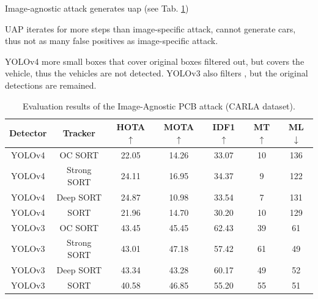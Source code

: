 Image-agnostic attack generates \acrfull{uap} (see Tab. \ref{tab.carla_uap})

UAP iterates for more steps than image-specific attack, cannot generate cars, thus not as many false positives as image-specific attack.

YOLOv4 more small boxes that cover original boxes filtered out, but covers the vehicle, thus the vehicles are not detected. YOLOv3 also filters , but the original detections are remained.


\begin{table}[H]
\centering
\begin{tabular}{ ccccccc } 
\hline
Detector & Tracker & HOTA $\uparrow$ & MOTA $\uparrow$ & IDF1 $\uparrow$ & MT $\uparrow$ & ML $\downarrow$ \\
\hline
YOLOv4 & OC SORT      &  22.05  &  14.26  &  33.07  &  10  &  136  \\
YOLOv4 & Strong SORT  &  24.11  &  16.95  &  34.37  &  9  &  122  \\ 
YOLOv4 & Deep SORT    &  24.87  &  10.98  &  33.54  &  7   &  131  \\ 
YOLOv4 & SORT         &  21.96  &  14.70  &  30.20  &  10   &  129  \\ 
\hline
YOLOv3 & OC SORT      &  43.45  &  45.45  &  62.43  &  39  &  61  \\
YOLOv3 & Strong SORT  &  43.01  &  47.18  &  57.42  &  61  &  49  \\ 
YOLOv3 & Deep SORT    &  43.34  &  43.28  &  60.17  &  49  &  52  \\ 
YOLOv3 & SORT         &  40.58  &  46.85  &  55.20  &  55  &  51  \\ 
\hline
\end{tabular}
\caption{Evaluation results of the Image-Agnostic PCB attack (CARLA dataset).}
\label{tab.carla_uap}
\end{table}

